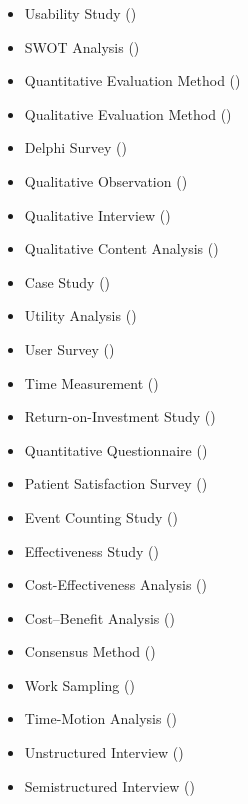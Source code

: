 \begin{itemize}
  \item Usability Study ()
  \item SWOT Analysis ()
  \item Quantitative Evaluation Method ()
  \item Qualitative Evaluation Method ()
  \item Delphi Survey ()
  \item Qualitative Observation ()
  \item Qualitative Interview ()
  \item Qualitative Content Analysis ()
  \item Case Study ()
  \item Utility Analysis ()
  \item User Survey ()
  \item Time Measurement ()
  \item Return-on-Investment Study ()
  \item Quantitative Questionnaire ()
  \item Patient Satisfaction Survey ()
  \item Event Counting Study ()
  \item Effectiveness Study ()
  \item Cost-Effectiveness Analysis ()
  \item Cost–Benefit Analysis ()
  \item Consensus Method ()
  \item Work Sampling ()
  \item Time-Motion Analysis ()
  \item Unstructured Interview ()
  \item Semistructured Interview ()
\end{itemize}

